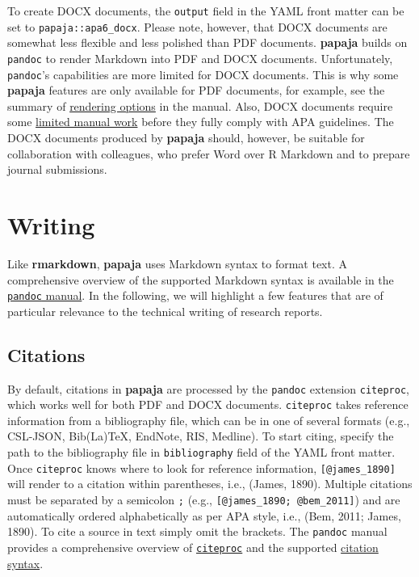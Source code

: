 \documentclass[
  ,man,floatsintext]{apa6}
\begin{document}
To create DOCX documents, the \texttt{output} field in the YAML front matter can be set to \texttt{papaja::apa6\_docx}.
Please note, however, that DOCX documents are somewhat less flexible and less polished than PDF documents.
\textbf{papaja} builds on \texttt{pandoc} to render Markdown into PDF and DOCX documents.
Unfortunately, \texttt{pandoc}'s capabilities are more limited for DOCX documents.
This is why some \textbf{papaja} features are only available for PDF documents, for example, see the summary of \href{http://frederikaust.com/papaja_man/r-markdown-components.html\#rendering-options}{rendering options} in the manual.
Also, DOCX documents require some \href{http://frederikaust.com/papaja_man/limitations.html\#microsoft-word-documents}{limited manual work} before they fully comply with APA guidelines.
The DOCX documents produced by \textbf{papaja} should, however, be suitable for collaboration with colleagues, who prefer Word over R Markdown and to prepare journal submissions.

\hypertarget{writing}{%
\section{Writing}\label{writing}}

Like \textbf{rmarkdown}, \textbf{papaja} uses Markdown syntax to format text.
A comprehensive overview of the supported Markdown syntax is available in the \href{https://pandoc.org/MANUAL.html\#pandocs-markdown}{\texttt{pandoc} manual}.
In the following, we will highlight a few features that are of particular relevance to the technical writing of research reports.

\hypertarget{citations}{%
\subsection{Citations}\label{citations}}

By default, citations in \textbf{papaja} are processed by the \texttt{pandoc} extension \texttt{citeproc}, which works well for both PDF and DOCX documents.
\texttt{citeproc} takes reference information from a bibliography file, which can be in one of several formats (e.g., CSL-JSON, Bib(La)TeX, EndNote, RIS, Medline).
To start citing, specify the path to the bibliography file in \texttt{bibliography} field of the YAML front matter.
Once \texttt{citeproc} knows where to look for reference information, \texttt{{[}@james\_1890{]}} will render to a citation within parentheses, i.e., (James, 1890).
Multiple citations must be separated by a semicolon \texttt{;} (e.g., \texttt{{[}@james\_1890;\ @bem\_2011{]}}) and are automatically ordered alphabetically as per APA style, i.e., (Bem, 2011; James, 1890).
To cite a source in text simply omit the brackets.
The \texttt{pandoc} manual provides a comprehensive overview of \href{https://pandoc.org/MANUAL.html\#citations}{\texttt{citeproc}} and the supported \href{https://pandoc.org/MANUAL.html\#citation-syntax}{citation syntax}.
\end{document}
